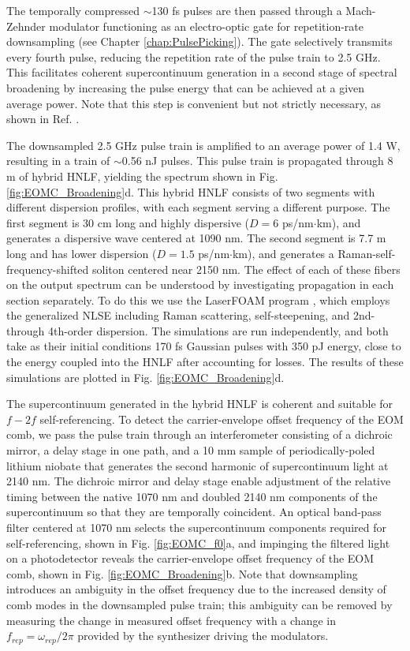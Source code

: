 The temporally compressed $\sim$130 fs pulses are then passed through a Mach-Zehnder modulator functioning as an electro-optic gate for repetition-rate downsampling (see Chapter \ref{chap:PulsePicking}). The gate selectively transmits every fourth pulse, reducing the repetition rate of the pulse train to 2.5 GHz. This facilitates coherent supercontinuum generation in a second stage of spectral broadening by increasing the pulse energy that can be achieved at a given average power. Note that this step is convenient but not strictly necessary, as shown in Ref. \cite{Beha2017}. 

The downsampled 2.5 GHz pulse train is amplified to an average power of 1.4 W, resulting in a train of $\sim$0.56 nJ pulses. This pulse train is propagated through 8 m of hybrid HNLF, yielding the spectrum shown in Fig. \ref{fig:EOMC_Broadening}d. This hybrid HNLF consists of two segments with different dispersion profiles, with each segment serving a different purpose. The first segment is 30 cm long and highly dispersive ($D=6$  ps/nm$\cdot$km), and generates a dispersive wave centered at 1090 nm. The second segment is 7.7 m long and has lower dispersion ($D=1.5$  ps/nm$\cdot$km), and generates a Raman-self-frequency-shifted soliton centered near 2150 nm. The effect of each of these fibers on the output spectrum can be understood by investigating propagation in each section separately. To do this we use the LaserFOAM program \cite{Amorim2009}, which employs the generalized NLSE including Raman scattering, self-steepening, and 2nd- through 4th-order dispersion. The simulations are run independently, and both take as their initial conditions 170 fs Gaussian pulses with 350 pJ energy, close to the energy coupled into the HNLF after accounting for losses. The results of these simulations are plotted in Fig. \ref{fig:EOMC_Broadening}d. 



The supercontinuum generated in the hybrid HNLF is coherent and suitable for $f-2f$ self-referencing. To detect the carrier-envelope offset frequency of the EOM comb, we pass the pulse train through an interferometer consisting of a dichroic mirror, a delay stage in one path, and a 10 mm sample of periodically-poled lithium niobate that generates the second harmonic of supercontinuum light at 2140 nm.  The dichroic mirror and delay stage enable adjustment of the relative timing between the native 1070 nm and doubled 2140 nm components of the supercontinuum so that they are temporally coincident. An optical band-pass filter centered at 1070 nm selects the supercontinuum components required for self-referencing, shown in Fig. \ref{fig:EOMC_f0}a, and impinging the filtered light on a photodetector reveals the carrier-envelope offset frequency of the EOM comb, shown in Fig. \ref{fig:EOMC_Broadening}b. Note that downsampling introduces an ambiguity in the offset frequency due to the increased density of comb modes in the downsampled pulse train; this ambiguity can be removed by measuring the change in measured offset frequency with a change in $f_{rep}=\omega_{rep}/2\pi$ provided by the synthesizer driving the modulators. 




